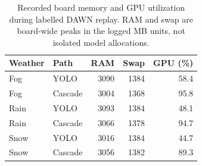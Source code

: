 \begin{table}[t]
\centering\small
\caption{Recorded board memory and GPU utilization during labelled DAWN replay. RAM and swap are board-wide peaks in the logged MB units, not isolated model allocations.}
\label{tab:memory}
\begin{tabular}{@{}llrrr@{}}\toprule
Weather & Path & RAM & Swap & GPU (\%)\\\midrule
Fog & YOLO & 3090 & 1384 & 58.4\\
Fog & Cascade & 3004 & 1368 & 95.8\\
Rain & YOLO & 3093 & 1384 & 48.1\\
Rain & Cascade & 3066 & 1378 & 94.7\\
Snow & YOLO & 3016 & 1384 & 44.7\\
Snow & Cascade & 3056 & 1382 & 89.3\\
\bottomrule
\end{tabular}
\end{table}

